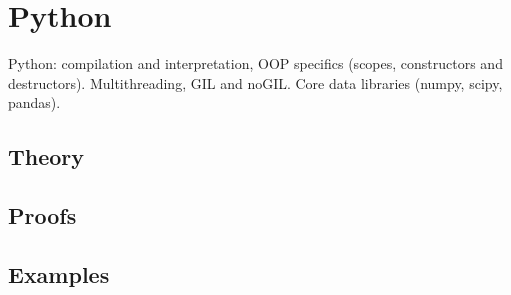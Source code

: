 
\section{Python}
\label{sec:2.3b.04-python}

\begin{ticket}
Python: compilation and interpretation, OOP specifics (scopes, constructors and destructors). Multithreading, GIL and noGIL. Core data libraries (numpy, scipy, pandas).
\end{ticket}

\subsection*{Theory}

\subsection*{Proofs}

\subsection*{Examples}
